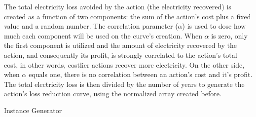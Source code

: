 The total electricity loss avoided by the action (the electricity recovered) is created as a function of two components: the sum of the action's
cost plus a fixed value and a random number. The correlation parameter ($\alpha$) is used to dose how much each component will be used on the curve's 
creation. When $\alpha$ is zero, only the first component is utilized and the amount of electricity recovered by the action, and consequently its profit,
is strongly correlated to the action's total cost, in other words, costlier actions recover more electricity. On the other side, when $\alpha$ equals
one, there is no correlation between an action's cost and it's profit. The total electricity loss is then divided by the number of years to generate the 
action's loss reduction curve, using the normalized array created before.

\begin{spacing}{1.2}
\begin{algorithm}[h]
\caption{Instance Generator}
\label{alg:gen}
\end{algorithm}
\end{spacing}

